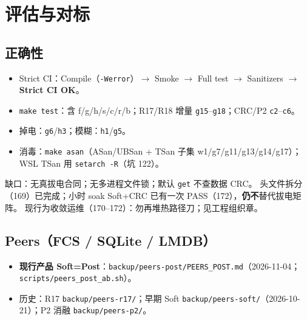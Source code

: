 \section{评估与对标}
\label{sec:eval}

\subsection{正确性}
\begin{itemize}[leftmargin=1.6em]
  \item Strict CI：Compile（\texttt{-Werror}）$\to$ Smoke $\to$ Full test $\to$ Sanitizers $\to$ \textbf{Strict CI OK}。
  \item \texttt{make test}：含 f/g/h/s/c/r/b；R17/R18 增量 \texttt{g15}--\texttt{g18}；CRC/P2 \texttt{c2}--\texttt{c6}。
  \item 掉电：\texttt{g6}/\texttt{h3}；模糊：\texttt{h1}/\texttt{g5}。
  \item 消毒：\texttt{make asan}（ASan/UBSan + TSan 子集 w1/g7/g11/g13/g14/g17）；WSL TSan 用 \texttt{setarch -R}（坑 122）。
\end{itemize}
缺口：无真拔电合同；无多进程文件锁；默认 \texttt{get} 不查数据 CRC。
头文件拆分（169）已完成；小时 soak Soft+CRC 已有一次 PASS（172），\textbf{仍不}替代拔电矩阵。
现行为收敛运维（170--172）：勿再堆热路径刀；见工程组织章。

\subsection{Peers（FCS / SQLite / LMDB）}
\begin{itemize}[leftmargin=1.6em]
  \item \textbf{现行产品 Soft=Post}：\texttt{backup/peers-post/PEERS\_POST.md}（2026-11-04；\texttt{scripts/peers\_post\_ab.sh}）。
  \item 历史：R17 \texttt{backup/peers-r17/}；早期 Soft \texttt{backup/peers-soft/}（2026-10-21）；P2 消融 \texttt{backup/peers-p2/}。
\end{itemize}

